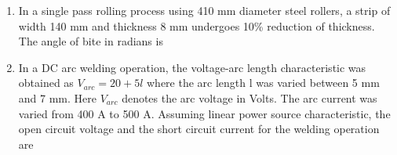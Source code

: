 \documentclass[journal,12pt,onecolumn]{IEEEtran}
\begin{document}
\begin{enumerate}[resume]
    \item In a single pass rolling process using 410 mm diameter steel rollers, a strip of width 140 mm and thickness 8 mm undergoes 10\% reduction of thickness. The angle of bite in radians is

          \begin{enumerate}
          \end{enumerate}

    \item In a DC arc welding operation, the voltage-arc length characteristic was obtained as \(V_{arc} = 20 + 5l\) where the arc length l was varied between 5 mm and 7 mm. Here \(V_{arc}\) denotes the arc voltage in Volts. The arc current was varied from 400 A to 500 A. Assuming linear power source characteristic, the open circuit voltage and the short circuit current for the welding operation are
          \begin{enumerate}
          \end{enumerate}


\end{enumerate}
\end{document}
